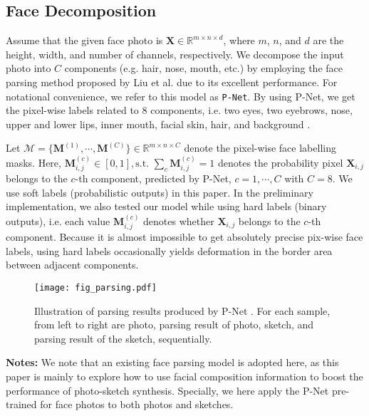 \documentclass[journal]{IEEEtran}
\begin{document}
\subsection{Face Decomposition}
\label{sec:faceparsing}

Assume that the given face photo is $\mathbf{X} \in \mathbb{R}^{m \times n \times d}$, where $m$, $n$, and $d$ are the height, width, and number of channels, respectively. We decompose the input photo into $C$ components (e.g. hair, nose, mouth, etc.) by employing the face parsing method proposed by Liu et al. \cite{Liu2015Multi} due to its excellent performance. For notational convenience, we refer to this model as \texttt{P-Net}. By using P-Net, we get the pixel-wise labels related to 8 components, i.e. two eyes, two eyebrows, nose, upper and lower lips, inner mouth, facial skin, hair, and background \cite{Liu2015Multi}. 

Let $\mathcal{M} = \{\mathbf{M}^{(1)}, \cdots, \mathbf{M}^{(C)} \} \in \mathbb{R}^{m \times n \times C}$ denote the pixel-wise face labelling masks. Here, $\mathbf{M}^{(c)}_{i,j} \in [0, 1], \text{s.t.~} \sum_c{\mathbf{M}^{(c)}_{i,j}}=1 $ denotes the probability pixel $\mathbf{X}_{i,j}$ belongs to the $c$-th component, predicted by P-Net, $c=1, \cdots, C$ with $C=8$. We use soft labels (probabilistic outputs) in this paper. In the preliminary implementation, we also tested our model while using hard labels (binary outputs), i.e. each value $\mathbf{M}^{(c)}_{i,j}$ denotes whether $\mathbf{X}_{i,j}$ belongs to the $c$-th component.
Because it is almost impossible to get absolutely precise pix-wise face labels, using hard labels occasionally yields deformation in the border area between adjacent components.



\begin{figure}
\begin{center}
\texttt{[image: fig\_parsing.pdf]}
\end{center}
   \vspace{-0.4cm}
   \caption{Illustration of parsing results produced by P-Net \cite{Liu2015Multi}. For each sample, from left to right are photo, parsing result of photo, sketch, and parsing result of the sketch, sequentially.}
\label{fig:parsing}
   \vspace{-0.4cm}
\end{figure}

\textbf{Notes:} 
We note that an existing face parsing model \cite{Liu2015Multi} is adopted here, as this paper is mainly to explore how to use facial composition information to boost the performance of photo-sketch synthesis. Specially, we here apply the P-Net \cite{Liu2015Multi} pre-trained for face photos to both photos and sketches. 
\end{document}
